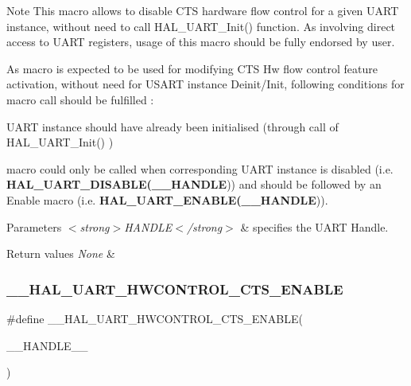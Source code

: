 \begin{DoxyNote}{Note}
This macro allows to disable C\+TS hardware flow control for a given U\+A\+RT instance, without need to call H\+A\+L\+\_\+\+U\+A\+R\+T\+\_\+\+Init() function. As involving direct access to U\+A\+RT registers, usage of this macro should be fully endorsed by user. 

As macro is expected to be used for modifying C\+TS Hw flow control feature activation, without need for U\+S\+A\+RT instance Deinit/\+Init, following conditions for macro call should be fulfilled \+:
\begin{DoxyItemize}
\item U\+A\+RT instance should have already been initialised (through call of H\+A\+L\+\_\+\+U\+A\+R\+T\+\_\+\+Init() )
\item macro could only be called when corresponding U\+A\+RT instance is disabled (i.\+e. {\bfseries H\+A\+L\+\_\+\+U\+A\+R\+T\+\_\+\+D\+I\+S\+A\+B\+LE(\+\_\+\+\_\+\+H\+A\+N\+D\+LE})) and should be followed by an Enable macro (i.\+e. {\bfseries H\+A\+L\+\_\+\+U\+A\+R\+T\+\_\+\+E\+N\+A\+B\+LE(\+\_\+\+\_\+\+H\+A\+N\+D\+LE})). 
\end{DoxyItemize}
\end{DoxyNote}

\begin{DoxyParams}{Parameters}
{\em $<$strong$>$\+H\+A\+N\+D\+L\+E$<$/strong$>$} & specifies the U\+A\+RT Handle. \\
\hline
\end{DoxyParams}

\begin{DoxyRetVals}{Return values}
{\em None} & \\
\hline
\end{DoxyRetVals}
\mbox{\label{group___u_a_r_t___exported___macros_ga4a77213945844bca4c22ba6a14b7ee4c}} 
\subsubsection{\texorpdfstring{\+\_\+\+\_\+\+H\+A\+L\+\_\+\+U\+A\+R\+T\+\_\+\+H\+W\+C\+O\+N\+T\+R\+O\+L\+\_\+\+C\+T\+S\+\_\+\+E\+N\+A\+B\+LE}{\_\_HAL\_UART\_HWCONTROL\_CTS\_ENABLE}}
{\footnotesize\ttfamily \#define \+\_\+\+\_\+\+H\+A\+L\+\_\+\+U\+A\+R\+T\+\_\+\+H\+W\+C\+O\+N\+T\+R\+O\+L\+\_\+\+C\+T\+S\+\_\+\+E\+N\+A\+B\+LE(\begin{DoxyParamCaption}\item[{}]{\+\_\+\+\_\+\+H\+A\+N\+D\+L\+E\+\_\+\+\_\+ }\end{DoxyParamCaption})}

